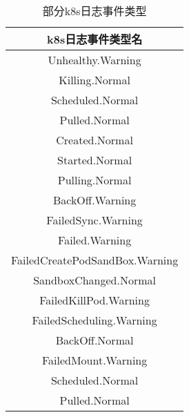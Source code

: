 \begin{table}[thbp]
    \centering
    \caption{部分k8s日志事件类型}
    \label{k8s-event}
    \begin{tabular}{c}
    \toprule[1.5pt]
    k8s日志事件类型名                     \\ \midrule[1.5pt]
    Unhealthy.Warning              \\
    Killing.Normal                 \\
    Scheduled.Normal               \\
    Pulled.Normal                  \\
    Created.Normal                 \\
    Started.Normal                 \\
    Pulling.Normal                 \\
    BackOff.Warning                \\
    FailedSync.Warning             \\
    Failed.Warning                 \\
    FailedCreatePodSandBox.Warning \\
    SandboxChanged.Normal          \\
    FailedKillPod.Warning          \\
    FailedScheduling.Warning       \\
    BackOff.Normal                 \\
    FailedMount.Warning            \\
    Scheduled.Normal               \\
    Pulled.Normal                  \\ \bottomrule[1.5pt]
    \end{tabular}
\end{table}

